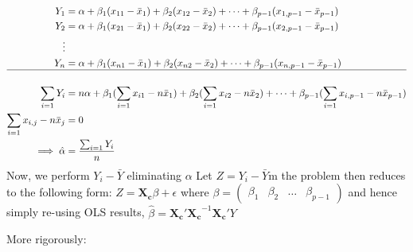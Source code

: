 \documentclass[a4paper]{article}
\begin{document}
\begin{align*}
Y_1 &= \alpha + \beta_1(x_{11}-\bar{x}_1) + \beta_2(x_{12} - \bar{x}_2) + \dots + \beta_{p-1}(x_{1,p-1}-\bar{x}_{p-1})\\
Y_2 &= \alpha + \beta_1(x_{21}-\bar{x}_1) + \beta_2(x_{22} - \bar{x}_2) + \dots + \beta_{p-1}(x_{2,p-1}-\bar{x}_{p-1})\\
\vdots \\
Y_n &= \alpha + \beta_1(x_{n1}-\bar{x}_1) + \beta_2(x_{n2} - \bar{x}_2) + \dots + \beta_{p-1}(x_{n,p-1}-\bar{x}_{p-1})\\
\hline\\
\sum_{i=1}Y_i &= n\alpha + \beta_1(\sum_{i=1}x_{i1}-n\bar{x}_1) + \beta_2(\sum_{i=1}x_{i2}-n\bar{x}_2) + \dots + \beta_{p-1}(\sum_{i=1}x_{i,p-1}-n\bar{x}_{p-1})\\
\sum_{i=1}x_{i,j}-n\bar{x}_j &= 0\\
\implies \hat{\alpha} &= \frac{\sum_{i=1}Y_i}{n}
\end{align*}
Now, we perform $Y_i-\bar{Y}$ eliminating $\alpha$ Let $Z=Y_i-\bar{Y}$m the problem then reduces to the following form: $Z = \mathbf{X_c}\beta + \epsilon$ where $\beta = \begin{pmatrix}
\beta_1 & \beta_2 & \dots & \beta_{p-1}
\end{pmatrix}$ and hence simply re-using OLS results, $\hat{\beta} =\mathbf{X_c'X_c}^{-1}\mathbf{X_c'}Y$

More rigorously:
\end{document}
